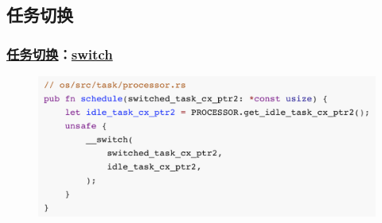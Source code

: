 \subsection{任务切换}
\begin{frame}[fragile]
    \frametitle{\href{https://rcore-os.github.io/rCore-Tutorial-Book-v3/chapter5/2core-data-structures.html\#idle}{任务切换}：\href{https://rcore-os.github.io/rCore_tutorial_doc/chapter6/part2.html}{switch}} 
	\begin{figure}
		\centering
		\includegraphics[width=0.7\linewidth]{figs/scheduler.png}
	\end{figure}




\end{frame}

